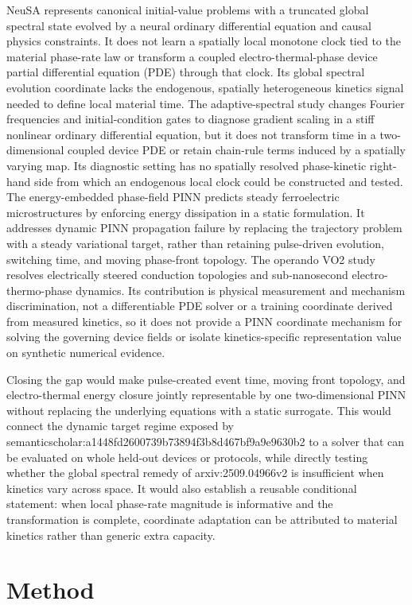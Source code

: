 \documentclass[10pt,a4paper]{article}
\begin{document}
NeuSA represents canonical initial-value problems with a truncated global spectral state evolved by a neural ordinary differential equation and causal physics constraints. It does not learn a spatially local monotone clock tied to the material phase-rate law or transform a coupled electro-thermal-phase device partial differential equation (PDE) through that clock. Its global spectral evolution coordinate lacks the endogenous, spatially heterogeneous kinetics signal needed to define local material time. The adaptive-spectral study changes Fourier frequencies and initial-condition gates to diagnose gradient scaling in a stiff nonlinear ordinary differential equation, but it does not transform time in a two-dimensional coupled device PDE or retain chain-rule terms induced by a spatially varying map. Its diagnostic setting has no spatially resolved phase-kinetic right-hand side from which an endogenous local clock could be constructed and tested. The energy-embedded phase-field PINN predicts steady ferroelectric microstructures by enforcing energy dissipation in a static formulation. It addresses dynamic PINN propagation failure by replacing the trajectory problem with a steady variational target, rather than retaining pulse-driven evolution, switching time, and moving phase-front topology. The operando VO2 study resolves electrically steered conduction topologies and sub-nanosecond electro-thermo-phase dynamics. Its contribution is physical measurement and mechanism discrimination, not a differentiable PDE solver or a training coordinate derived from measured kinetics, so it does not provide a PINN coordinate mechanism for solving the governing device fields or isolate kinetics-specific representation value on synthetic numerical evidence.

Closing the gap would make pulse-created event time, moving front topology, and electro-thermal energy closure jointly representable by one two-dimensional PINN without replacing the underlying equations with a static surrogate. This would connect the dynamic target regime exposed by semanticscholar:a1448fd2600739b73894f3b8d467bf9a9e9630b2 to a solver that can be evaluated on whole held-out devices or protocols, while directly testing whether the global spectral remedy of arxiv:2509.04966v2 is insufficient when kinetics vary across space. It would also establish a reusable conditional statement: when local phase-rate magnitude is informative and the transformation is complete, coordinate adaptation can be attributed to material kinetics rather than generic extra capacity.
\section*{Method}
\end{document}
